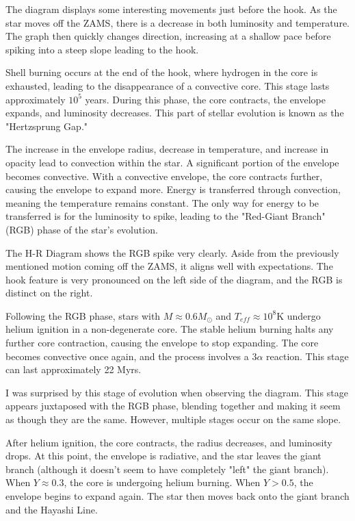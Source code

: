 \documentclass[fleqn,usenatbib]{mnras}
\begin{document}
\par The diagram displays some interesting movements just before the hook. As the star moves off the ZAMS, there is a decrease in both luminosity and temperature. The graph then quickly changes direction, increasing at a shallow pace before spiking into a steep slope leading to the hook.

\par Shell burning occurs at the end of the hook, where hydrogen in the core is exhausted, leading to the disappearance of a convective core. This stage lasts approximately \(10^5\) years. During this phase, the core contracts, the envelope expands, and luminosity decreases. This part of stellar evolution is known as the "Hertzsprung Gap."

\par The increase in the envelope radius, decrease in temperature, and increase in opacity lead to convection within the star. A significant portion of the envelope becomes convective. With a convective envelope, the core contracts further, causing the envelope to expand more. Energy is transferred through convection, meaning the temperature remains constant. The only way for energy to be transferred is for the luminosity to spike, leading to the "Red-Giant Branch" (RGB) phase of the star's evolution.

\par The H-R Diagram shows the RGB spike very clearly. Aside from the previously mentioned motion coming off the ZAMS, it aligns well with expectations. The hook feature is very pronounced on the left side of the diagram, and the RGB is distinct on the right.

\par Following the RGB phase, stars with \(M \approx 0.6 M_\odot\) and \(T_{eff} \approx 10^8 \text{K}\) undergo helium ignition in a non-degenerate core. The stable helium burning halts any further core contraction, causing the envelope to stop expanding. The core becomes convective once again, and the process involves a \(3\alpha\) reaction. This stage can last approximately 22 Myrs.

\par I was surprised by this stage of evolution when observing the diagram. This stage appears juxtaposed with the RGB phase, blending together and making it seem as though they are the same. However, multiple stages occur on the same slope.

\par After helium ignition, the core contracts, the radius decreases, and luminosity drops. At this point, the envelope is radiative, and the star leaves the giant branch (although it doesn’t seem to have completely "left" the giant branch). When \(Y \approx 0.3\), the core is undergoing helium burning. When \(Y > 0.5\), the envelope begins to expand again. The star then moves back onto the giant branch and the Hayashi Line.
\end{document}
